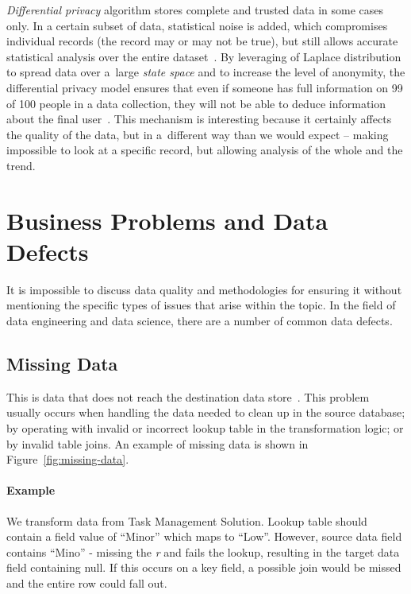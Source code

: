 \textit{Differential privacy} algorithm stores complete and trusted data in some cases only.
In a certain subset of data, statistical noise is added, which compromises individual records (the record may or may not be true), but still allows accurate statistical analysis over the entire dataset~\cite{difpriv2016}.
By leveraging of Laplace distribution to spread data over a~large \textit{state space} and to increase the level of anonymity, the differential privacy model ensures that even if someone has full information on 99 of 100 people in a data collection, they will not be able to deduce information about the final user~\cite{web:differential-privacy,dwork2014}.
This mechanism is interesting because it certainly affects the quality of the data, but in a~different way than we would expect – making impossible to look at a specific record, but allowing analysis of the whole and the trend.

\section{Business Problems and Data Defects}

It is impossible to discuss data quality and methodologies for ensuring it without mentioning the specific types of issues that arise within the topic.
In the field of data engineering and data science, there are a number of common data defects.

\subsection*{Missing Data}

This is data that does not reach the destination data store~\cite{web:common-defects}.
This problem usually occurs when handling the data needed to clean up in the source database; by operating with invalid or incorrect lookup table in the transformation logic; or by invalid table joins.
An example of missing data is shown in Figure~\ref{fig:missing-data}.

\paragraph*{Example} We transform data from Task Management Solution.
Lookup table should contain a field value of \enquote{Minor} which maps to \enquote{Low}.
However, source data field contains \enquote{Mino} - missing the \textit{r} and fails the lookup, resulting in the target data field containing null.
If this occurs on a key field, a possible join would be missed and the entire row could fall out.

